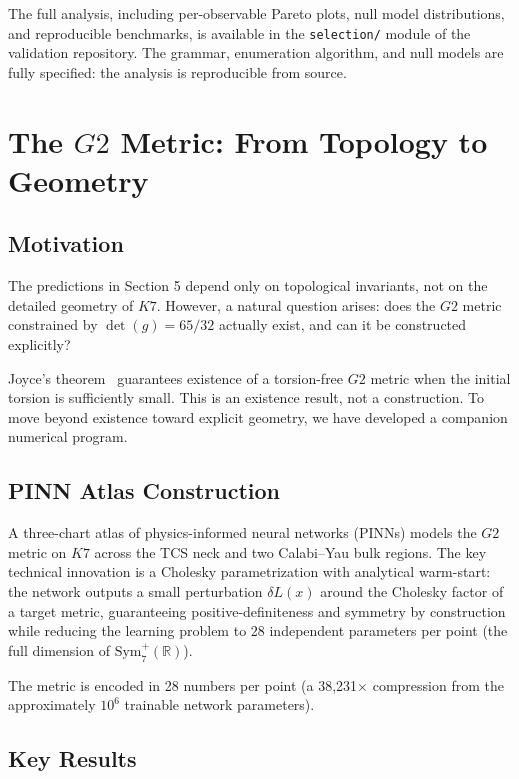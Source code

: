 \documentclass[11pt,a4paper]{article}
\newcommand{\Gtwo}{\mathrm{G}_2}
\newcommand{\Kseven}{K_7}
\def\Gtwo{G2}%
\def\Kseven{K7}%
\begin{document}
The full analysis, including per-observable Pareto plots, null model distributions, and reproducible benchmarks, is available in the \texttt{selection/} module of the validation repository. The grammar, enumeration algorithm, and null models are fully specified: the analysis is reproducible from source.

\section{The $\Gtwo$ Metric: From Topology to Geometry}

\subsection{Motivation}

The predictions in Section 5 depend only on topological invariants, not on the detailed geometry of $\Kseven$. However, a natural question arises: does the $\Gtwo$ metric constrained by $\det(g) = 65/32$ actually exist, and can it be constructed explicitly?

Joyce's theorem~\cite{joyce2000} guarantees existence of a torsion-free $\Gtwo$ metric when the initial torsion is sufficiently small. This is an existence result, not a construction. To move beyond existence toward explicit geometry, we have developed a companion numerical program.

\subsection{PINN Atlas Construction}

A three-chart atlas of physics-informed neural networks (PINNs) models the $\Gtwo$ metric on $\Kseven$ across the TCS neck and two Calabi--Yau bulk regions. The key technical innovation is a Cholesky parametrization with analytical warm-start: the network outputs a small perturbation $\delta L(x)$ around the Cholesky factor of a target metric, guaranteeing positive-definiteness and symmetry by construction while reducing the learning problem to 28 independent parameters per point (the full dimension of $\mathrm{Sym}^+_7(\mathbb{R})$).

The metric is encoded in 28 numbers per point (a 38,231$\times$ compression from the approximately $10^6$ trainable network parameters).

\subsection{Key Results}
\end{document}
